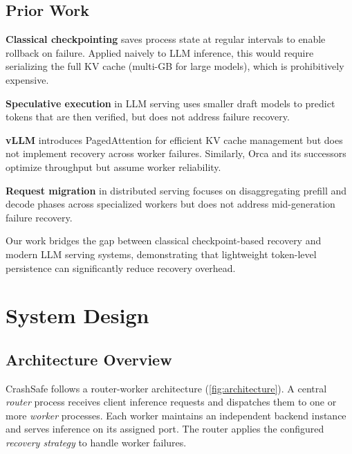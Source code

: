 \documentclass[10pt,twocolumn]{article}
\newcommand{\sys}{CrashSafe}
\begin{document}
\subsection{Prior Work}

\textbf{Classical checkpointing} \cite{chandy1985distributed, elnozahy2002survey}
saves process state at regular intervals to enable rollback on failure.
Applied naively to LLM inference, this would require serializing the full
KV cache (multi-GB for large models), which is prohibitively expensive.

\textbf{Speculative execution} in LLM serving \cite{leviathan2023speculative}
uses smaller draft models to predict tokens that are then verified, but does
not address failure recovery.

\textbf{vLLM} \cite{kwon2023vllm} introduces PagedAttention for efficient
KV cache management but does not implement recovery across worker failures.
Similarly, Orca \cite{yu2022orca} and its successors optimize throughput
but assume worker reliability.

\textbf{Request migration} in distributed serving \cite{zhong2024distserve}
focuses on disaggregating prefill and decode phases across specialized workers
but does not address mid-generation failure recovery.

Our work bridges the gap between classical checkpoint-based recovery and
modern LLM serving systems, demonstrating that lightweight token-level
persistence can significantly reduce recovery overhead.

\section{System Design}
\label{sec:design}

\subsection{Architecture Overview}

\sys{} follows a router-worker architecture (\autoref{fig:architecture}).
A central \textit{router} process receives client inference requests and
dispatches them to one or more \textit{worker} processes. Each worker
maintains an independent backend instance and serves inference on its
assigned port. The router applies the configured \textit{recovery strategy}
to handle worker failures.
\end{document}
